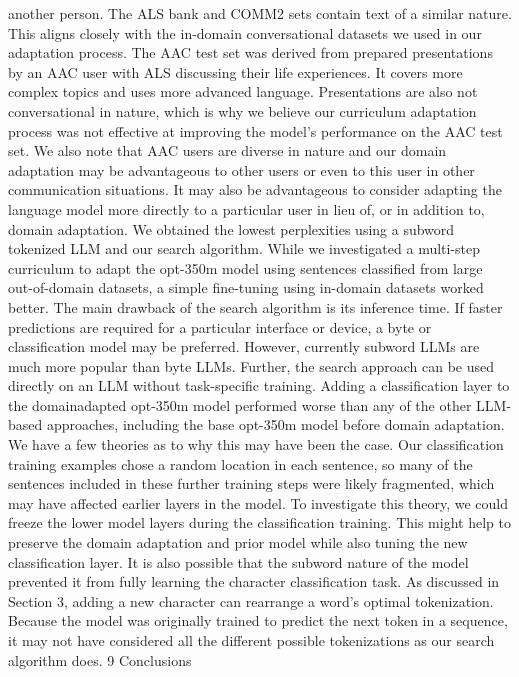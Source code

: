 another person. The ALS bank and COMM2 sets
contain text of a similar nature. This aligns closely
with the in-domain conversational datasets we used
in our adaptation process.
The AAC test set was derived from prepared presentations by an AAC user with ALS discussing
their life experiences. It covers more complex topics and uses more advanced language. Presentations are also not conversational in nature, which
is why we believe our curriculum adaptation process was not effective at improving the model’s
performance on the AAC test set. We also note that
AAC users are diverse in nature and our domain
adaptation may be advantageous to other users or
even to this user in other communication situations.
It may also be advantageous to consider adapting
the language model more directly to a particular
user in lieu of, or in addition to, domain adaptation.
We obtained the lowest perplexities using a subword tokenized LLM and our search algorithm.
While we investigated a multi-step curriculum to
adapt the opt-350m model using sentences classified from large out-of-domain datasets, a simple
fine-tuning using in-domain datasets worked better.
The main drawback of the search algorithm is its
inference time. If faster predictions are required for
a particular interface or device, a byte or classification model may be preferred. However, currently
subword LLMs are much more popular than byte
LLMs. Further, the search approach can be used
directly on an LLM without task-specific training.
Adding a classification layer to the domainadapted opt-350m model performed worse than
any of the other LLM-based approaches, including
the base opt-350m model before domain adaptation.
We have a few theories as to why this may have
been the case. Our classification training examples
chose a random location in each sentence, so many
of the sentences included in these further training
steps were likely fragmented, which may have affected earlier layers in the model. To investigate
this theory, we could freeze the lower model layers
during the classification training. This might help
to preserve the domain adaptation and prior model
while also tuning the new classification layer.
It is also possible that the subword nature of the
model prevented it from fully learning the character classification task. As discussed in Section 3,
adding a new character can rearrange a word’s optimal tokenization. Because the model was originally
trained to predict the next token in a sequence, it
may not have considered all the different possible
tokenizations as our search algorithm does.
9 Conclusions
